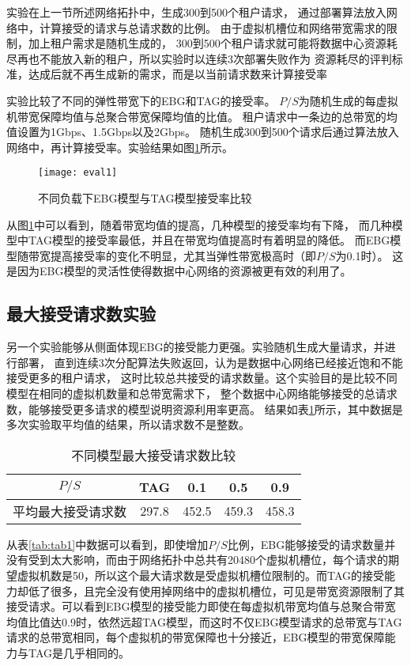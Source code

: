 实验在上一节所述网络拓扑中，生成300到500个租户请求，
通过部署算法放入网络中，计算接受的请求与总请求数的比例。
由于虚拟机槽位和网络带宽需求的限制，加上租户需求是随机生成的，
300到500个租户请求就可能将数据中心资源耗尽再也不能放入新的租户，所以实验时以连续3次部署失败作为
资源耗尽的评判标准，达成后就不再生成新的需求，而是以当前请求数来计算接受率

实验比较了不同的弹性带宽下的EBG和TAG的接受率。
$P/S$为随机生成的每虚拟机带宽保障均值与总聚合带宽保障均值的比值。
租户请求中一条边的总带宽的均值设置为1Gbps、1.5Gbps以及2Gbps。
随机生成300到500个请求后通过算法放入网络中，再计算接受率。实验结果如图\ref{fig:fig5.1}所示。

\begin{figure}[H]
  \centering
  \texttt{[image: eval1]}
  \caption{不同负载下EBG模型与TAG模型接受率比较}
  \label{fig:fig5.1}
\end{figure}

从图\ref{fig:fig5.1}中可以看到，随着带宽均值的提高，几种模型的接受率均有下降，
而几种模型中TAG模型的接受率最低，并且在带宽均值提高时有着明显的降低。
而EBG模型随带宽提高接受率的变化不明显，尤其当弹性带宽极高时（即$P/S$为0.1时）。
这是因为EBG模型的灵活性使得数据中心网络的资源被更有效的利用了。

\subsection{最大接受请求数实验}
另一个实验能够从侧面体现EBG的接受能力更强。实验随机生成大量请求，并进行部署，
直到连续3次分配算法失败返回，认为是数据中心网络已经接近饱和不能接受更多的租户请求，
这时比较总共接受的请求数量。这个实验目的是比较不同模型在相同的虚拟机数量和总带宽需求下，
整个数据中心网络能够接受的总请求数，能够接受更多请求的模型说明资源利用率更高。
结果如表\ref{tab:tab2}所示，其中数据是多次实验取平均值的结果，所以请求数不是整数。

\begin{table}[h]
  \centering
  \caption{不同模型最大接受请求数比较}
  \label{tab:tab2}
  \begin{tabular}{c | c c c c}
  \hline
  $P/S$ & TAG & 0.1 & 0.5 & 0.9 \\ \hline
  平均最大接受请求数 & 297.8 & 452.5 & 459.3 & 458.3 \\
  \hline
  \end{tabular}
\end{table}

从表\ref{tab:tab1}中数据可以看到，即使增加$P/S$比例，EBG能够接受的请求数量并没有受到太大影响，而由于网络拓扑中总共有20480个虚拟机槽位，每个请求的期望虚拟机数是50，所以这个最大请求数是受虚拟机槽位限制的。而TAG的接受能力却低了很多，且完全没有使用掉网络中的虚拟机槽位，可见是带宽资源限制了其接受请求。可以看到EBG模型的接受能力即使在每虚拟机带宽均值与总聚合带宽均值比值达0.9时，依然远超TAG模型，而这时不仅EBG模型请求的总带宽与TAG请求的总带宽相同，每个虚拟机的带宽保障也十分接近，EBG模型的带宽保障能力与TAG是几乎相同的。

